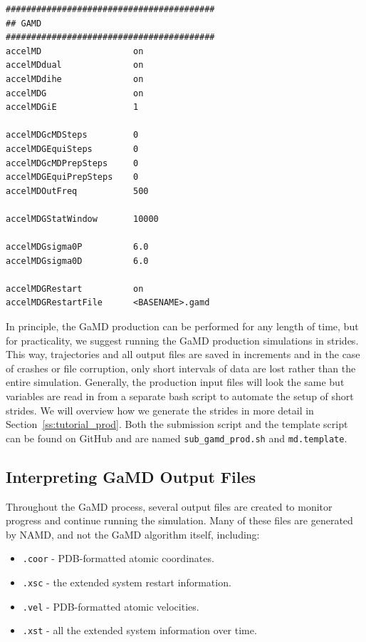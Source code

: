\documentclass[9pt,tutorial,pubversion]{livecoms}
\begin{document}
\begin{lstlisting}[label=gamd_prod,caption=md.*.in, basicstyle=\small,backgroundcolor=\color{light-gray}]
#########################################
## GAMD                    
#########################################
accelMD                  on             
accelMDdual              on
accelMDdihe              on
accelMDG                 on        
accelMDGiE               1             
         
accelMDGcMDSteps         0        
accelMDGEquiSteps        0     
accelMDGcMDPrepSteps     0         
accelMDGEquiPrepSteps    0         
accelMDOutFreq           500

accelMDGStatWindow       10000

accelMDGsigma0P          6.0            
accelMDGsigma0D          6.0 

accelMDGRestart          on 
accelMDGRestartFile      <BASENAME>.gamd  

\end{lstlisting}

In principle, the GaMD production can be performed for any length of time, but for practicality, we suggest running the GaMD production simulations in strides. This way, trajectories and all output files are saved in increments and in the case of crashes or file corruption, only short intervals of data are lost rather than the entire simulation. Generally, the production input files will look the same but variables are read in from a separate bash script to automate the setup of short strides. We will overview how we generate the strides in more detail in Section~\ref{ss:tutorial_prod}. Both the submission script and the template script can be found on GitHub and are named \texttt{sub\_gamd\_prod.sh} and \texttt{md.template}.

\subsection{Interpreting GaMD Output Files}
\label{ss:interpret_output}
Throughout the GaMD process, several output files are created to monitor progress and continue running the simulation. Many of these files are generated by NAMD, and not the GaMD algorithm itself, including:

\begin{itemize}
    \item \texttt{.coor} - PDB-formatted atomic coordinates.
    \item \texttt{.xsc} - the extended system restart information.
    \item \texttt{.vel} - PDB-formatted atomic velocities.
    \item \texttt{.xst} - all the extended system information over time. 
    
\end{itemize}
\end{document}
